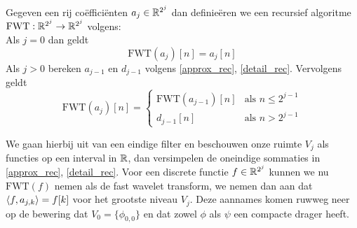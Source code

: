 \begin{algo}
  Gegeven een rij co\"effici\"enten $a_j\in\mathbb{R}^{2^j}$ dan definie\"eren we een recursief
  algoritme $\mathrm{FWT}:\mathbb{R}^{2^j}\to\mathbb{R}^{2^j}$ volgens:\\
  Als $j=0$ dan geldt
  \[
  \mathrm{FWT}(a_j)[n] = a_j[n]
  \]
  Als $j>0$ bereken $a_{j-1}$ en $d_{j-1}$ volgens \ref{approx_rec}, \ref{detail_rec}.
  Vervolgens geldt
  \begin{equation}
    \label{FWT_cases}
    \mathrm{FWT}(a_j)[n] = \begin{cases}
      \mathrm{FWT}(a_{j-1})[n] & \text{als } n\leq 2^{j-1} \\
      d_{j-1}[n] & \text{als } n>2^{j-1} \end{cases}
  \end{equation}
\end{algo}
We gaan hierbij uit van een eindige filter en beschouwen onze ruimte $V_j$ als functies
op een interval in $\mathbb{R}$, dan versimpelen de oneindige sommaties in \ref{approx_rec},
\ref{detail_rec}. Voor een discrete functie $f\in\mathbb{R}^{2^j}$ kunnen we nu
$\mathrm{FWT}(f)$ nemen als de fast wavelet transform,
we nemen dan aan dat $\langle f , a_{j,k} \rangle = f[k]$ voor het
grootste niveau $V_j$. Deze aannames komen ruwweg neer op de bewering dat
$V_0 = \{\phi_{0,0}\}$ en dat zowel $\phi$ als $\psi$ een compacte drager heeft.

